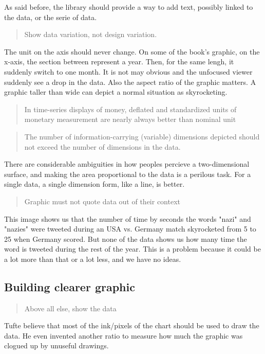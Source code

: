 As said before, the library should provide a way to add text, possibly linked to the data, or the serie of data.
\begin{quote}
Show data variation, not design variation.
\end{quote}
The unit on the axis should never change. On some of the book's graphic, on the x-axis, the section between represent a year.
Then, for the same lengh, it suddenly switch to one month. It is not may obvious and the unfocused viewer suddenly see a drop in the data. 
Also the aspect ratio of the graphic matters. A graphic taller than wide can depict a normal situation as skyrocketing.

\begin{quote}
In time-series displays of money, deflated and standardized units of monetary measurement are nearly always better than nominal unit
\end{quote}

\begin{quote}
The number of information-carrying (variable) dimensions depicted should not exceed the number of dimensions in the data.
\end{quote}
There are considerable ambiguities in how peoples percieve a two-dimensional surface, and making the area proportional to the data is a perilous task. For a single data, a single dimension form, like a line, is better.

\begin{quote}
Graphic must not quote data out of their context
\end{quote}
This image shows us that the number of time by seconds the words "nazi" and "nazies" were tweeted during an USA vs. Germany match skyrocketed from 5 to 25 when Germany scored.
But none of the data shows us how many time the word is tweeted during the rest of the year. This is a problem because it could be a lot more than that or a lot less, and we have no ideas.

\subsection{Building clearer graphic}
\begin{quote}
Above all else, show the data
\end{quote}

Tufte believe that most of the ink/pixels of the chart should be used to draw the data. He even invented another ratio to measure how much the graphic was clogued up by unuseful drawings.

